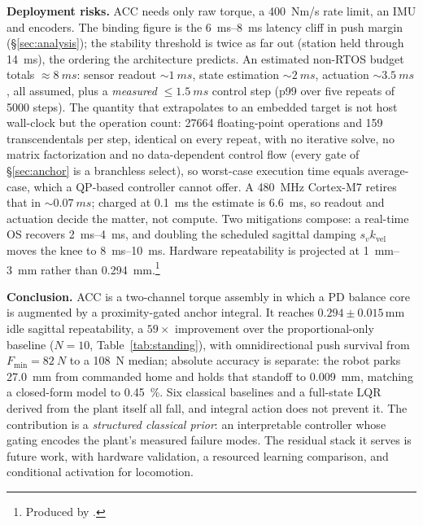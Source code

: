 \documentclass{jcd}
\begin{document}
\textbf{Deployment risks.}
ACC needs only raw torque, a \SI{400}{Nm/s} rate limit, an IMU and encoders. The
binding figure is the \SIrange{6}{8}{ms} latency cliff in push margin
(\S\ref{sec:analysis}); the stability threshold is twice as far out (station
held through \SI{14}{ms}), the ordering the architecture predicts. An
estimated non-RTOS budget totals ${\approx}\SI{8}{ms}$: sensor readout
${\sim}\SI{1}{ms}$, state estimation ${\sim}\SI{2}{ms}$, actuation ${\sim}\SI{3.5}{ms}$, all assumed, plus a \emph{measured} ${\le}\SI{1.5}{ms}$
control step (p99 over five repeats of \num{5000} steps). The quantity that
extrapolates to an embedded target is not host wall-clock but the operation
count: \num{27664} floating-point operations and \num{159} transcendentals per
step, identical on every repeat, with no iterative solve, no matrix factorization
and no data-dependent control flow (every gate of \S\ref{sec:anchor} is a branchless select), so worst-case execution time equals average-case, which a
QP-based controller cannot offer. A \SI{480}{MHz}
Cortex-M7 retires that in ${\sim}\SI{0.07}{ms}$; charged at \SI{0.1}{ms} the
estimate is \SI{6.6}{ms}, so readout and actuation decide the matter, not
compute. Two mitigations compose: a real-time OS recovers
\SIrange{2}{4}{ms}, and doubling the scheduled sagittal damping $s_v k_{\text{vel}}$ moves the knee to
\SIrange{8}{10}{ms}. Hardware repeatability is projected at \SIrange{1}{3}{mm}
rather than \SI{0.294}{mm}.\footnote{Produced by
.}

\textbf{Conclusion.}
ACC is a two-channel torque assembly in which a PD balance core is augmented by
a proximity-gated anchor integral. It reaches $0.294{\pm}0.015$\,mm idle
sagittal repeatability, a $59{\times}$ improvement over the proportional-only
baseline ($N{=}10$, Table~\ref{tab:standing}), with omnidirectional push survival
from $F_{\min}{=}\SI{82}{N}$ to a \SI{108}{N} median; absolute accuracy is separate: the robot parks \SI{27.0}{mm} from commanded home and holds that
standoff to \SI{0.009}{mm}, matching a closed-form model to
\SI{0.45}{\percent}. Six classical baselines and a full-state LQR derived from
the plant itself all fall, and integral action does not prevent it. The
contribution is a \emph{structured classical prior}: an interpretable controller
whose gating encodes the plant's measured failure modes. The residual stack it
serves is future work, with hardware validation, a resourced learning
comparison, and conditional activation for locomotion.
\end{document}
